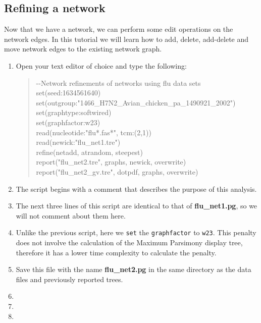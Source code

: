\documentclass[11pt]{article}
\begin{document}
\subsection{Refining a network}
\label{subsec:refininganetwork}

Now that we have a network, we can perform some edit operations on the network
edges. In this tutorial we will learn how to add, delete, add-delete and move network
edges to the existing network graph.

\begin {enumerate}

\item Open your text editor of choice and type the following:

	\begin{quote}	
	-\/-Network refinements of networks using flu data sets\\
	set(seed:1634561640)\\
	set(outgroup:"1466\_H7N2\_Avian\_chicken\_pa\_1490921\_2002")\\
	set(graphtype:softwired)\\
	set(graphfactor:w23)\\ 
	read(nucleotide:"flu*.fas*", tcm:(2,1))\\
	read(newick:"flu\_net1.tre")\\
	refine(netadd, atrandom, steepest)\\
	report("flu\_net2.tre", graphs, newick, overwrite)\\
	report("flu\_net2\_gv.tre", dotpdf, graphs, overwrite)
	\end{quote}

\item The script begins with a comment that describes the purpose of this 
analysis.

\item The next three lines of this script are identical to that of \textbf{flu\_net1.pg}, 
so we will not comment about them here. 

\item Unlike the previous script, here we \texttt{set} the \texttt{graphfactor} to 
\texttt{w23}. This penalty does not involve the calculation of the Maximum 
Parsimony display tree, therefore it has a lower time complexity to calculate
the penalty.

\item Save this file with the name \textbf{flu\_net2.pg} in the same directory as the 
data files and previously reported trees.

\item

\item

\item



\end{enumerate}




\end{document}
